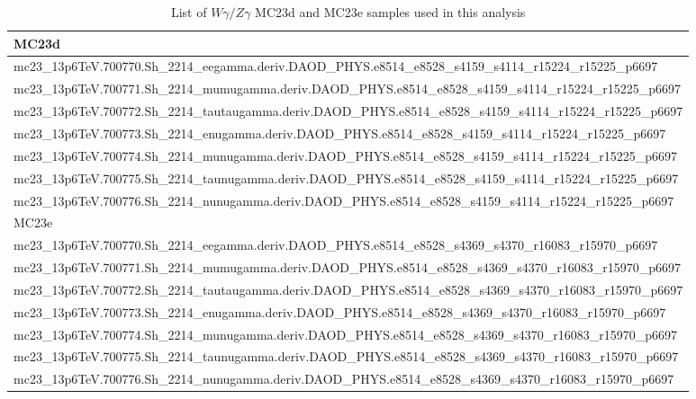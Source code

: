 \begin{table}[ht]
\centering
\scriptsize
\caption{List of $W\gamma/Z\gamma$ MC23d and MC23e samples used in this analysis}
\label{tab:Vy-samples}
\begin{tabular}{l}
\toprule
MC23d \\
\midrule
mc23\_13p6TeV.700770.Sh\_2214\_eegamma.deriv.DAOD\_PHYS.e8514\_e8528\_s4159\_s4114\_r15224\_r15225\_p6697\\
mc23\_13p6TeV.700771.Sh\_2214\_mumugamma.deriv.DAOD\_PHYS.e8514\_e8528\_s4159\_s4114\_r15224\_r15225\_p6697\\
mc23\_13p6TeV.700772.Sh\_2214\_tautaugamma.deriv.DAOD\_PHYS.e8514\_e8528\_s4159\_s4114\_r15224\_r15225\_p6697\\
mc23\_13p6TeV.700773.Sh\_2214\_enugamma.deriv.DAOD\_PHYS.e8514\_e8528\_s4159\_s4114\_r15224\_r15225\_p6697\\
mc23\_13p6TeV.700774.Sh\_2214\_munugamma.deriv.DAOD\_PHYS.e8514\_e8528\_s4159\_s4114\_r15224\_r15225\_p6697\\
mc23\_13p6TeV.700775.Sh\_2214\_taunugamma.deriv.DAOD\_PHYS.e8514\_e8528\_s4159\_s4114\_r15224\_r15225\_p6697\\
mc23\_13p6TeV.700776.Sh\_2214\_nunugamma.deriv.DAOD\_PHYS.e8514\_e8528\_s4159\_s4114\_r15224\_r15225\_p6697\\
\midrule
MC23e \\
\midrule
mc23\_13p6TeV.700770.Sh\_2214\_eegamma.deriv.DAOD\_PHYS.e8514\_e8528\_s4369\_s4370\_r16083\_r15970\_p6697\\
mc23\_13p6TeV.700771.Sh\_2214\_mumugamma.deriv.DAOD\_PHYS.e8514\_e8528\_s4369\_s4370\_r16083\_r15970\_p6697\\
mc23\_13p6TeV.700772.Sh\_2214\_tautaugamma.deriv.DAOD\_PHYS.e8514\_e8528\_s4369\_s4370\_r16083\_r15970\_p6697\\
mc23\_13p6TeV.700773.Sh\_2214\_enugamma.deriv.DAOD\_PHYS.e8514\_e8528\_s4369\_s4370\_r16083\_r15970\_p6697\\
mc23\_13p6TeV.700774.Sh\_2214\_munugamma.deriv.DAOD\_PHYS.e8514\_e8528\_s4369\_s4370\_r16083\_r15970\_p6697\\
mc23\_13p6TeV.700775.Sh\_2214\_taunugamma.deriv.DAOD\_PHYS.e8514\_e8528\_s4369\_s4370\_r16083\_r15970\_p6697\\
mc23\_13p6TeV.700776.Sh\_2214\_nunugamma.deriv.DAOD\_PHYS.e8514\_e8528\_s4369\_s4370\_r16083\_r15970\_p6697\\
\bottomrule
\end{tabular}
\end{table}


